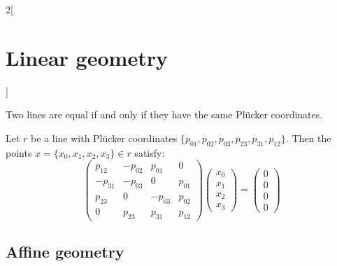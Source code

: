 \documentclass[../../../main_math.tex]{subfiles}
\begin{document}
\begin{multicols}{2}[\section{Linear geometry}]
\begin{proposition}
  \end{proposition}
  \begin{proposition}
    Two lines are equal if and only if they have the same Plücker coordinates.
  \end{proposition}
  \begin{proposition}
    Let $r$ be a line with Plücker coordinates $\{p_{01},p_{02},p_{03},p_{23},p_{31},p_{12}\}$. Then the points $x=\{x_0,x_1,x_2,x_3\}\in r$ satisfy: $$\begin{pmatrix}
        p_{12}  & -p_{02} & p_{01}  & 0      \\
        -p_{31} & -p_{03} & 0       & p_{01} \\
        p_{23}  & 0       & -p_{03} & p_{02} \\
        0       & p_{23}  & p_{31}  & p_{12}
      \end{pmatrix}\begin{pmatrix}
        x_0 \\
        x_1 \\
        x_2 \\
        x_3
      \end{pmatrix}=\begin{pmatrix}
        0 \\
        0 \\
        0 \\
        0
      \end{pmatrix}$$
  \end{proposition}
  \subsection{Affine geometry}

\end{multicols}
\end{document}
